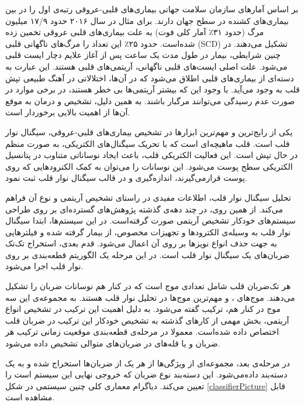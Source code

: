 
\pagebreak

بر اساس آمارهای سازمان سلامت جهانی بیماری‌های قلبی-عروقی  رتبه‌ی اول را در بین بیماری‌های کشنده در سطح جهان دارند. برای مثال در سال ۲۰۱۶ حدود ۱۷/۹ میلیون مرگ (حدود ۳۱٪ آمار کلی فوت) به علت بیماری‌های قلبی عروقی تخمین زده شده‌است. \cite{WHO} حدود ۲۵٪ این تعداد را مرگ‌های ناگهانی قلبی (SCD) تشکیل می‌دهند. \cite{Srinivasan2018} در چنین شرایطی، بیمار در طول مدت یک ساعت پس از آغاز علایم دچار ایست قلبی می‌شود. 
علت اصلی ایست‌های قلبی ناگهانی، آریتمی‌های قلبی هستند. \cite{Cleveland} این عبارت به دسته‌ای از بیماری‌های قلبی اطلاق می‌شود که در آن‌ها، اختلالاتی در آهنگ طبیعی تپش قلب به وجود می‌آید. با وجود این که بیشتر آریتمی‌ها بی خطر هستند، در برخی موارد در صورت عدم رسیدگی می‌توانند مرگبار باشند. به همین دلیل، تشخیص و درمان به موقع آن‌ها از اهمیت بالایی برخوردار است. 

یکی از رایج‌ترین و مهم‌ترین ابزارها در تشخیص بیماری‌های قلبی-عروقی، سیگنال نوار قلب  است. \cite {Elgendi2014} قلب ماهیچه‌ای است که با تحریک سیگنال‌های الکتریکی، به صورت منظم در حال تپش است. این فعالیت الکتریکی قلب، باعث ایجاد نوساناتی متناوب در پتانسیل الکتریکی سطح پوست می‌شود. این نوسانات  را می‌توان به کمک الکترودهایی که روی پوست قرارمی‌گیرند، اندازه‌گیری و در قالب سیگنال نوار قلب ثبت نمود. 

تحلیل سیگنال نوار قلب، اطلاعات مفیدی در راستای تشخیص آریتمی و نوع آن فراهم می‌کند. \cite{Mondejar} از همین روی، در چند دهه‌ی گذشته پژوهش‌های گسترده‌ای بر روی طراحی سیستم‌های خودکار تشخیص آریتمی صورت گرفته‌است. در این سیستم‌ها، ابتدا سیگنال نوار قلب به وسیله‌ی الکترودها و تجهیزات مخصوص، از بیمار گرفته شده و فیلترهایی به جهت حذف انواع نویزها بر روی آن اعمال می‌شود. قدم بعدی، استخراج تک‌تک ضربان‌های یک سیگنال نوار قلب است. در این مرحله یک الگوریتم قطعه‌بندی  بر روی نوار قلب اجرا می‌شود.

هر تک‌ضربان قلب شامل تعدادی موج است که در کنار هم نوسانات ضربان را تشکیل می‌دهند. موج‌های ،  و  مهم‌ترین موج‌ها در تحلیل نوار قلب هستند.\cite{Mondejar} به مجموعه‌ی این سه موج در کنار هم، ترکیب  گفته می‌شود. به دلیل اهمیت این ترکیب در تشخیص انواع آریتمی، بخش مهمی از کارهای گذشته به تشخیص خودکار این ترکیب در ضربان قلب اختصاص داده شده‌است. معمولا در مرحله‌ی قطعه‌بندی موقعیت زمانی ترکیب  هر ضربان و یا قله‌های  در ضربان‌های متوالی تشخیص داده می‌شود.

 در مرحله‌ی بعد، مجموعه‌ای از ویژگی‌ها از هر یک از ضربان‌ها استخراج شده و به یک دسته‌بند  داده‌می‌شود. این دسته‌بند نوع ضربان که خروجی نهایی این سیستم است را تعیین می‌کند. دیاگرام معماری کلی چنین سیستمی در شکل \ref{classifierPicture} قابل مشاهده است. 
 
